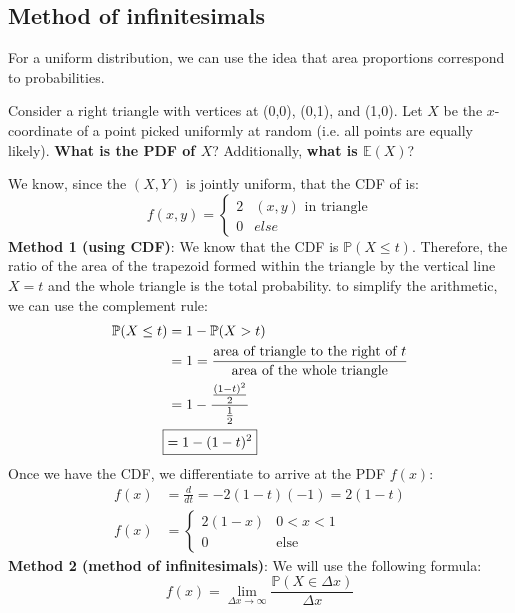 \documentclass[titlepage, 12pt, leqno]{article}
\begin{document}
\subsection{Method of infinitesimals}
For a uniform distribution, we can use the idea that area proportions correspond
to probabilities.
\begin{ex}
    Consider a right triangle with vertices at (0,0), (0,1), and (1,0). Let
    $X$ be the $x$-coordinate of a point picked uniformly at random (i.e. all
    points are equally likely). \textbf{What is the PDF of $X$}? Additionally,
    \textbf{what is $ \mathbb{E}(X)$}?
    \vspace{10px}
    
    We know, since the $(X,Y)$ is jointly uniform, that the CDF of is:
    \[
    f(x,y) = 
    \begin{cases}
        2 & (x,y) \text{ in triangle} \\
        0 & else
    \end{cases}
    \]
    \textbf{Method 1 (using CDF)}: We know that the CDF is $\mathbb{P}(X \le t)$.
    Therefore, the ratio of the area of the trapezoid formed within the triangle
    by the vertical line $X=t$ and the whole triangle is the total probability.
    to simplify the arithmetic, we can use the complement rule:
    \begin{align*}
        \mathbb{P}(X \le t) &= 1 - \mathbb{P}(X > t) \\
                            &= 1 = \frac{ \text{area of triangle to the 
                        right of $t$}}{ \text{area of the whole triangle}} \\
                            &= 1 - \frac{\frac{(1-t)^2}{2}}{\frac{1}{2}} \\
        \Aboxed{&= 1 - (1-t)^2} 
    \end{align*}
    Once we have the CDF, we differentiate to arrive at the PDF $f(x)$:
    \begin{align*}
        f(x) &= \frac{d}{dt} = -2(1-t)(-1) = 2(1-t) \\
        f(x) &=
        \begin{cases}
            2(1-x) & 0<x<1 \\
            0 & \text{else}
        \end{cases}
    \end{align*}
    \textbf{Method 2 (method of infinitesimals)}: We will use the following
    formula:
    \[
        \boxed{ f(x) = \lim_{\Delta x \to \infty} \frac{\mathbb{P}(X \in 
        \Delta x)}{\Delta x}}
\]
\end{ex}
\end{document}
